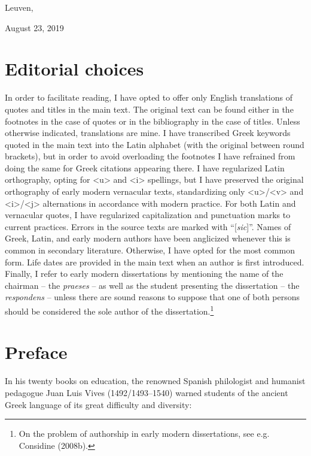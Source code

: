 \begin{styleStandard}
Leuven,
\end{styleStandard}

\begin{styleStandard}
August 23, 2019
\end{styleStandard}

\section{Editorial choices}
\hypertarget{Toc19704800}{}\begin{styleStandard}
In order to facilitate reading, I have opted to offer only English translations of quotes and titles in the main text. The original text can be found either in the footnotes in the case of quotes or in the bibliography in the case of titles. Unless otherwise indicated, translations are mine. I have transcribed Greek keywords quoted in the main text into the Latin alphabet (with the original between round brackets), but in order to avoid overloading the footnotes I have refrained from doing the same for Greek citations appearing there. I have regularized Latin orthography, opting for {\textless}u{\textgreater} and {\textless}i{\textgreater} spellings, but I have preserved the original orthography of early modern vernacular texts, standardizing only {\textless}u{\textgreater}/{\textless}v{\textgreater} and {\textless}i{\textgreater}/{\textless}j{\textgreater} alternations in accordance with modern practice. For both Latin and vernacular quotes, I have regularized capitalization and punctuation marks to current practices. Errors in the source texts are marked with “[\textit{sic}]”. Names of Greek, Latin, and early modern authors have been anglicized whenever this is common in secondary literature. Otherwise, I have opted for the most common form. Life dates are provided in the main text when an author is first introduced. Finally, I refer to early modern dissertations by mentioning the name of the chairman – the \textit{praeses} – as well as the student presenting the dissertation – the \textit{respondens} – unless there are sound reasons to suppose that one of both persons should be considered the sole author of the dissertation.\footnote{ On the problem of authorship in early modern dissertations, see e.g. Considine (2008b).}
\end{styleStandard}

\clearpage\section{Preface}
\hypertarget{Toc19704801}{}\begin{styleStandard}
In his twenty books on education, the renowned Spanish philologist and humanist pedagogue Juan Luis Vives (1492/1493–1540) warned students of the ancient Greek language of its great difficulty and diversity:
\end{styleStandard}

